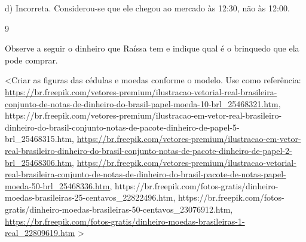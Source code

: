 \begin{escolha}
\begin{escolha}
{{{{d) Incorreta. Considerou-se que ele chegou ao mercado às 12:30, não às 12:00.

\num{9}

Observe a seguir o dinheiro que Raíssa tem e indique qual é o brinquedo que ela pode comprar.

\textless{}Criar as figuras das cédulas e moedas conforme o modelo. Use
como referência:
\url{https://br.freepik.com/vetores-premium/ilustracao-vetorial-real-brasileira-conjunto-de-notas-de-dinheiro-do-brasil-papel-moeda-10-brl_25468321.htm},
https://br.freepik.com/vetores-premium/ilustracao-em-vetor-real-brasileiro-dinheiro-do-brasil-conjunto-notas-de-pacote-dinheiro-de-papel-5-brl\_25468315.htm,
\url{https://br.freepik.com/vetores-premium/ilustracao-em-vetor-real-brasileiro-dinheiro-do-brasil-conjunto-notas-de-pacote-dinheiro-de-papel-2-brl_25468306.htm},
\url{https://br.freepik.com/vetores-premium/ilustracao-vetorial-real-brasileira-conjunto-de-notas-de-dinheiro-do-brasil-pacote-de-notas-papel-moeda-50-brl_25468336.htm,}
https://br.freepik.com/fotos-gratis/dinheiro-moedas-brasileiras-25-centavos\_22822496.htm,
https://br.freepik.com/fotos-gratis/dinheiro-moedas-brasileiras-50-centavos\_23076912.htm,
\url{https://br.freepik.com/fotos-gratis/dinheiro-moedas-brasileiras-1-real_22809619.htm}
\textgreater{}

}}}}
\end{escolha}
\end{escolha}
